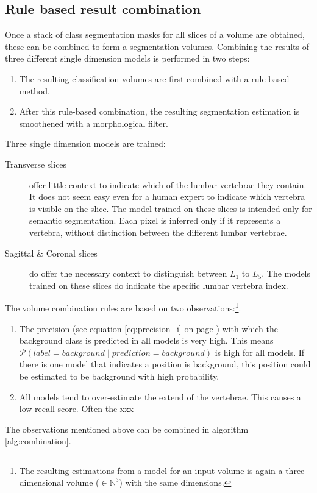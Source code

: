 \subsection{Rule based result combination}
Once a stack of class segmentation masks for all slices of a volume are obtained, these can be combined to form a segmentation volumes.
Combining the results of three different single dimension models is performed in two steps:
\begin{enumerate}
    \item The resulting classification volumes are first combined with a rule-based method.
    \item After this rule-based combination, the resulting segmentation estimation is smoothened with a morphological filter.
\end{enumerate}

Three single dimension models are trained:
\begin{description}
    \item[Transverse slices] offer little context to indicate which of the lumbar vertebrae they contain. 
    It does not seem easy even for a human expert to indicate which vertebra is visible on the slice.
    The model trained on these slices is intended only for semantic segmentation.
    Each pixel is inferred only if it represents a vertebra, without distinction between the different lumbar vertebrae. 
    \item[Sagittal \& Coronal slices] do offer the necessary context to distinguish between $L_1$ to $L_5$. 
    The models trained on these slices do indicate the specific lumbar vertebra index. 
\end{description}

The volume combination rules are based on two observations:\footnote{
    The resulting estimations from a model for an input volume is again a three-dimensional volume ($\in \mathbb{N}^3$) with the same dimensions.
}.
\begin{enumerate}
    \item The precision (see equation \ref{eq:precision_i} on page \pageref{eq:precision_i}) with which the background class is predicted in all models is very high.
            This means $\mathcal{P} \left( label = background \mid prediction = background \right)$ is high for all models. 
            If there is one model that indicates a position is background, this position could be estimated to be background with high probability.
    \item All models tend to over-estimate the extend of the vertebrae. This causes a low recall score. Often the xxx
\end{enumerate}
The observations mentioned above can be combined in algorithm \ref{alg:combination}.

